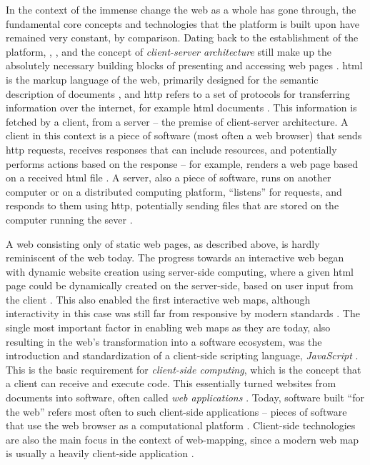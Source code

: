 In the context of the immense change the web as a whole has gone through,
the fundamental core concepts and technologies that the platform is built upon
have remained very constant, by comparison.
Dating back to the establishment of the platform,
, , and the concept of
\textit{client-server architecture}
still make up the absolutely necessary building blocks
of presenting and accessing web pages \parencite{ber1994, tai2017}.
\acrshort{html} is the markup language of the web,
primarily designed for the semantic description of documents \parencite{w3chtml},
and \acrshort{http} refers to a set of protocols for transferring information over the internet,
for example \acrshort{html} documents \parencite{ietfhttp1, ietfhttp2, ietfhttp3}.
This information is fetched by a client, from a server --
the premise of client-server architecture.
A client in this context is
a piece of software (most often a web browser) that sends \acrshort{http} requests,
receives responses that can include resources,
and potentially performs actions based on the response --
for example, renders a web page based on a received \acrshort{html} file
\parencite{sac2017}.
A server, also a piece of software,
runs on another computer or on a distributed computing platform,
\enquote{listens} for requests,
and responds to them using \acrshort{http},
potentially sending files that are stored on the computer running the sever
\parencite{sac2017}.

A web consisting only of static web pages, as described above,
is hardly reminiscent of the web today.
The progress towards an interactive web began with
dynamic website creation using server-side computing,
where a given \acrshort{html} page could be dynamically created on the server-side,
based on user input from the client \parencite{jac2019}.
This also enabled the first interactive web maps,
although interactivity in this case was still
far from responsive by modern standards \parencite{vee2017}.
The single most important factor in enabling web maps as they are today,
also resulting in the web's transformation into a software ecosystem,
was the introduction and standardization of a client-side scripting language,
\textit{JavaScript} \parencite{cho2014, vee2017}.
This is the basic requirement for \textit{client-side computing},
which is the concept that a client can
receive and execute code.
This essentially turned websites from documents
into software, often called \textit{web applications} \parencite{jac2019}.
Today, software built \enquote{for the web} refers most often to
such client-side applications -- pieces of software
that use the web browser as a computational platform \parencite{tai2017}.
Client-side technologies are also the main focus in the context of web-mapping,
since a modern web map is usually a heavily client-side application
\parencite{rot2014}.

